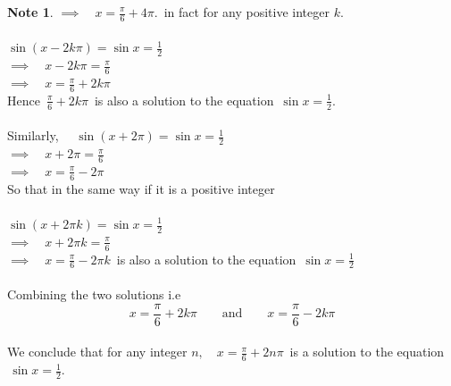 \documentclass[11pt,a4paper]{article}
\theoremstyle{definition}
\newtheorem{note}[thm]{Note}
\begin{document}
\begin{note}
$\implies \quad  x = \frac{\pi}{6} + 4\pi.\,$ in fact for any positive integer $k$.\\\\





$\sin ( x - 2k\pi) = \sin x = \frac{1}{2}$\\

$\implies \quad  x - 2k\pi = \frac{\pi}{6}$\\

$\implies \quad  x = \frac{\pi}{6} + 2k\pi$\\

Hence $\, \frac{\pi}{6} + 2k\pi\,$ is also a solution to the equation $\, \sin x = \frac{1}{2}$.\\\\





Similarly, $\quad  \sin ( x + 2\pi) = \sin x = \frac{1}{2}$\\

$\implies\quad  x + 2\pi  = \frac{\pi}{6}$\\

$\implies \quad  x = \frac{\pi}{6}- 2\pi$\\

So that in the same way if it is a positive integer\\\\





$\sin ( x + 2\pi k ) = \sin x = \frac{1}{2}$\\


$\implies \quad  x + 2\pi k = \frac{\pi}{6}$\\

$\implies \quad  x = \frac{\pi}{6} - 2\pi k\,$ is also a solution to the equation $\, \sin x = \frac{1}{2}$\\\\




Combining the two solutions i.e $$x = \frac{\pi}{6} + 2k\pi \qquad  \text{and}\qquad     x = \frac{\pi}{6} - 2k\pi$$\\



We conclude that for any integer $n,\quad  x = \frac{\pi}{6} + 2n\pi\,$ is a solution to the equation $\, \sin x = \frac{1}{2}$.\\\\




\end{note}
\end{document}
